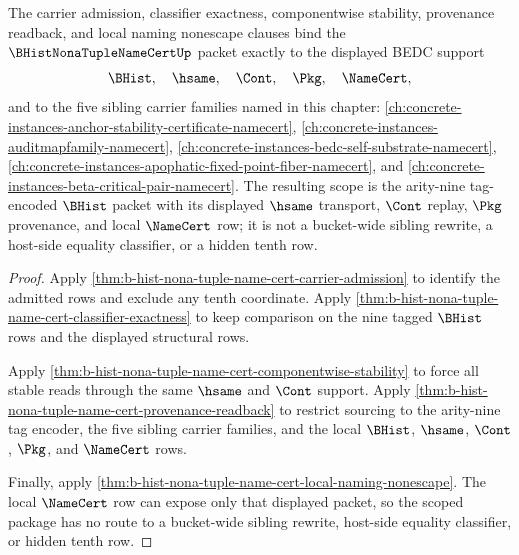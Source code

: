 \begin{theorem}
\label{thm:b-hist-nona-tuple-name-cert-scoped-support-package}
The carrier admission, classifier exactness, componentwise stability, provenance readback, and local naming nonescape clauses bind the $\BHistNonaTupleNameCertUp$ packet exactly to the displayed BEDC support
$$
\BHist,\quad \hsame,\quad \Cont,\quad \Pkg,\quad \NameCert,
$$
and to the five sibling carrier families named in this chapter:
\autoref{ch:concrete-instances-anchor-stability-certificate-namecert},
\autoref{ch:concrete-instances-auditmapfamily-namecert},
\autoref{ch:concrete-instances-bedc-self-substrate-namecert},
\autoref{ch:concrete-instances-apophatic-fixed-point-fiber-namecert},
and \autoref{ch:concrete-instances-beta-critical-pair-namecert}. The resulting scope is the arity-nine tag-encoded $\BHist$ packet with its displayed $\hsame$ transport, $\Cont$ replay, $\Pkg$ provenance, and local $\NameCert$ row; it is not a bucket-wide sibling rewrite, a host-side equality classifier, or a hidden tenth row.
\end{theorem}
\begin{proof}
Apply \autoref{thm:b-hist-nona-tuple-name-cert-carrier-admission} to identify the admitted rows and exclude any tenth coordinate. Apply \autoref{thm:b-hist-nona-tuple-name-cert-classifier-exactness} to keep comparison on the nine tagged $\BHist$ rows and the displayed structural rows.

Apply \autoref{thm:b-hist-nona-tuple-name-cert-componentwise-stability} to force all stable reads through the same $\hsame$ and $\Cont$ support. Apply \autoref{thm:b-hist-nona-tuple-name-cert-provenance-readback} to restrict sourcing to the arity-nine tag encoder, the five sibling carrier families, and the local $\BHist$, $\hsame$, $\Cont$, $\Pkg$, and $\NameCert$ rows.

Finally, apply \autoref{thm:b-hist-nona-tuple-name-cert-local-naming-nonescape}. The local $\NameCert$ row can expose only that displayed packet, so the scoped package has no route to a bucket-wide sibling rewrite, host-side equality classifier, or hidden tenth row.
\end{proof}



